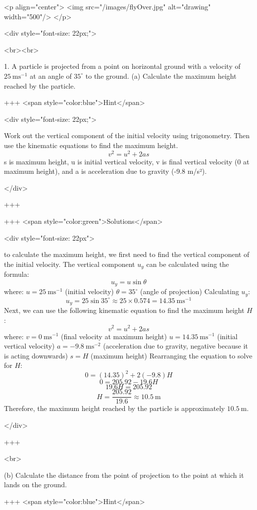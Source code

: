 <p align="center">
<img src="/images/flyOver.jpg" alt="drawing" width="500"/>
</p>

<div style="font-size: 22px;">

<br><br>

1. A particle is projected from a point on horizontal ground with a velocity of $25 \mathrm{~ms}^{-1}$ at an angle of $35^{\circ}$ to the ground.
(a) Calculate the maximum height reached by the particle.

+++ <span style="color:blue">Hint</span>

<div style="font-size: 22px;">

Work out the vertical component of the initial velocity using trigonometry. Then use the kinematic equations to find the maximum height.
$$ v^2 = u^2 + 2 a s $$
s is maximum height, u is initial vertical velocity, v is final vertical velocity (0 at maximum height), and a is acceleration due to gravity (-9.8 m/s²).

</div>

+++

+++ <span style="color:green">Solutions</span>

<div style="font-size: 22px">

to calculate the maximum height, we first need to find the vertical component of the initial velocity. The vertical component $u_y$ can be calculated using the formula:
$$ u_y = u \sin \theta $$
where:
$u = 25 \mathrm{~ms}^{-1}$ (initial velocity)
$\theta = 35^{\circ}$ (angle of projection)
Calculating $u_y$:
$$ u_y = 25 \sin 35^{\circ} \approx 25 \times 0.574 = 14.35 \mathrm{~ms}^{-1} $$
Next, we can use the following kinematic equation to find the maximum height $H$:
$$ v^2 = u^2 + 2 a s $$
where:
$v = 0 \mathrm{~ms}^{-1}$ (final velocity at maximum height)
$u = 14.35 \mathrm{~ms}^{-1}$ (initial vertical velocity)
$a = -9.8 \mathrm{~ms}^{-2}$ (acceleration due to gravity, negative because it is acting downwards)
$s = H$ (maximum height)
Rearranging the equation to solve for $H$:
$$ 0 = (14.35)^2 + 2(-9.8)H $$
$$ 0 = 205.92 - 19.6H $$
$$ 19.6H = 205.92 $$
$$ H = \frac{205.92}{19.6} \approx 10.5 \mathrm{~m} $$
Therefore, the maximum height reached by the particle is approximately $10.5 \mathrm{~m}$.

</div>

+++

<br>

(b) Calculate the distance from the point of projection to the point at which it lands on the ground.

+++ <span style="color:blue">Hint</span>

